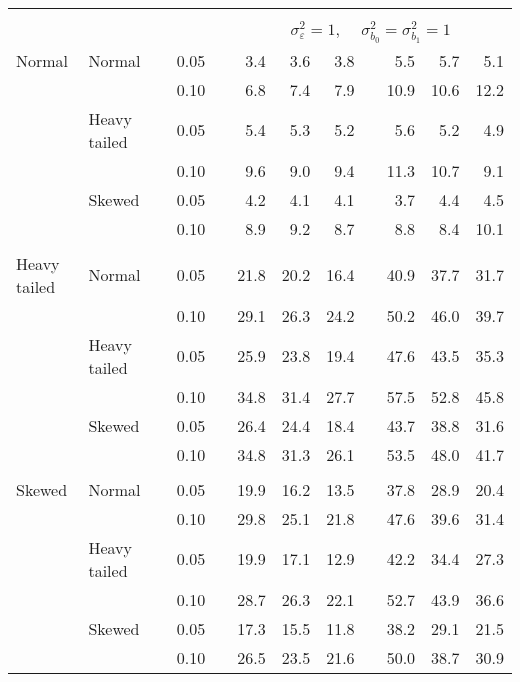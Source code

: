 \begin{table}[ht]
\begin{scriptsize}
\begin{tabular}{ll p{.1cm} c p{.1cm} rrr p{.1cm} rrr}
&&&&&&&&&&&\\
& && && \multicolumn{7}{c}{$\sigma_{\varepsilon}^2 = 1$, \ \ $\sigma_{b_0}^2 = \sigma_{b_1}^2 = 1$} \\ \cline{6-12}
\rowcolor{gray!20} Normal & Normal &  & 0.05 &  & 3.4 & 3.6 & 3.8 &  & 5.5 & 5.7 & 5.1 \\ 
\rowcolor{gray!20}    &  &  & 0.10 &  & 6.8 & 7.4 & 7.9 &  & 10.9 & 10.6 & 12.2 \\ 
\rowcolor{gray!20}    & Heavy tailed &  & 0.05 &  & 5.4 & 5.3 & 5.2 &  & 5.6 & 5.2 & 4.9 \\ 
\rowcolor{gray!20}    &  &  & 0.10 &  & 9.6 & 9.0 & 9.4 &  & 11.3 & 10.7 & 9.1 \\ 
\rowcolor{gray!20}    & Skewed &  & 0.05 &  & 4.2 & 4.1 & 4.1 &  & 3.7 & 4.4 & 4.5 \\ 
\rowcolor{gray!20}    &  &  & 0.10 &  & 8.9 & 9.2 & 8.7 &  & 8.8 & 8.4 & 10.1 \\ 
&&&&&&&&&&&\\
  Heavy tailed & Normal &  & 0.05 &  & 21.8 & 20.2 & 16.4 &  & 40.9 & 37.7 & 31.7 \\ 
   &  &  & 0.10 &  & 29.1 & 26.3 & 24.2 &  & 50.2 & 46.0 & 39.7 \\ 
   & Heavy tailed &  & 0.05 &  & 25.9 & 23.8 & 19.4 &  & 47.6 & 43.5 & 35.3 \\ 
   &  &  & 0.10 &  & 34.8 & 31.4 & 27.7 &  & 57.5 & 52.8 & 45.8 \\ 
   & Skewed &  & 0.05 &  & 26.4 & 24.4 & 18.4 &  & 43.7 & 38.8 & 31.6 \\ 
   &  &  & 0.10 &  & 34.8 & 31.3 & 26.1 &  & 53.5 & 48.0 & 41.7 \\ 
&&&&&&&&&&&\\
  Skewed & Normal &  & 0.05 &  & 19.9 & 16.2 & 13.5 &  & 37.8 & 28.9 & 20.4 \\ 
   &  &  & 0.10 &  & 29.8 & 25.1 & 21.8 &  & 47.6 & 39.6 & 31.4 \\ 
   & Heavy tailed &  & 0.05 &  & 19.9 & 17.1 & 12.9 &  & 42.2 & 34.4 & 27.3 \\ 
   &  &  & 0.10 &  & 28.7 & 26.3 & 22.1 &  & 52.7 & 43.9 & 36.6 \\ 
   & Skewed &  & 0.05 &  & 17.3 & 15.5 & 11.8 &  & 38.2 & 29.1 & 21.5 \\ 
   &  &  & 0.10 &  & 26.5 & 23.5 & 21.6 &  & 50.0 & 38.7 & 30.9 \\ 



\end{tabular}
\end{scriptsize}
\end{table}

